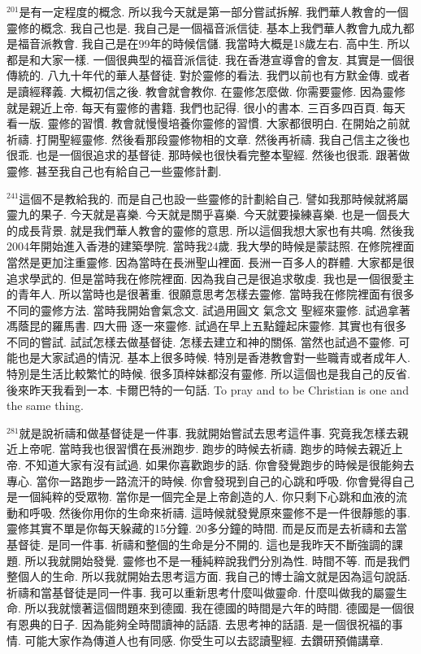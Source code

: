 \documentclass{book}
\begin{document}
$^{201}$是有一定程度的概念.
所以我今天就是第一部分嘗試拆解.
我們華人教會的一個靈修的概念.
我自己也是.
我自己是一個福音派信徒.
基本上我們華人教會九成九都是福音派教會.
我自己是在99年的時候信儲.
我當時大概是18歲左右.
高中生.
所以都是和大家一樣.
一個很典型的福音派信徒.
我在香港宣導會的會友.
其實是一個很傳統的.
八九十年代的華人基督徒.
對於靈修的看法.
我們以前也有方默金傳.
或者是讀經釋義.
大概初信之後.
教會就會教你.
在靈修怎麼做.
你需要靈修.
因為靈修就是親近上帝.
每天有靈修的書籍.
我們也記得.
很小的書本.
三百多四百頁.
每天看一版.
靈修的習慣.
教會就慢慢培養你靈修的習慣.
大家都很明白.
在開始之前就祈禱.
打開聖經靈修.
然後看那段靈修物相的文章.
然後再祈禱.
我自己信主之後也很乖.
也是一個很追求的基督徒.
那時候也很快看完整本聖經.
然後也很乖.
跟著做靈修.
甚至我自己也有給自己一些靈修計劃.

$^{241}$這個不是教給我的.
而是自己也設一些靈修的計劃給自己.
譬如我那時候就將屬靈九的果子.
今天就是喜樂.
今天就是關乎喜樂.
今天就要操練喜樂.
也是一個長大的成長背景.
就是我們華人教會的靈修的意思.
所以這個我想大家也有共鳴.
然後我2004年開始進入香港的建築學院.
當時我24歲.
我大學的時候是蒙誌照.
在修院裡面當然是更加注重靈修.
因為當時在長洲聖山裡面.
長洲一百多人的群體.
大家都是很追求學武的.
但是當時我在修院裡面.
因為我自己是很追求敬虔.
我也是一個很愛主的青年人.
所以當時也是很著重.
很願意思考怎樣去靈修.
當時我在修院裡面有很多不同的靈修方法.
當時我開始會氣念文.
試過用圓文 氣念文 聖經來靈修.
試過拿著馮蔭昆的羅馬書.
四大冊 逐一來靈修.
試過在早上五點鐘起床靈修.
其實也有很多不同的嘗試.
試試怎樣去做基督徒.
怎樣去建立和神的關係.
當然也試過不靈修.
可能也是大家試過的情況.
基本上很多時候.
特別是香港教會對一些職青或者成年人.
特別是生活比較繁忙的時候.
很多頂梓妹都沒有靈修.
所以這個也是我自己的反省.
後來昨天我看到一本.
卡爾巴特的一句話.
To pray and to be Christian is one and the same thing.

$^{281}$就是說祈禱和做基督徒是一件事.
我就開始嘗試去思考這件事.
究竟我怎樣去親近上帝呢.
當時我也很習慣在長洲跑步.
跑步的時候去祈禱.
跑步的時候去親近上帝.
不知道大家有沒有試過.
如果你喜歡跑步的話.
你會發覺跑步的時候是很能夠去專心.
當你一路跑步一路流汗的時候.
你會發現到自己的心跳和呼吸.
你會覺得自己是一個純粹的受眾物.
當你是一個完全是上帝創造的人.
你只剩下心跳和血液的流動和呼吸.
然後你用你的生命來祈禱.
這時候就發覺原來靈修不是一件很靜態的事.
靈修其實不單是你每天躲藏的15分鐘.
20多分鐘的時間.
而是反而是去祈禱和去當基督徒.
是同一件事.
祈禱和整個的生命是分不開的.
這也是我昨天不斷強調的課題.
所以我就開始發覺.
靈修也不是一種純粹說我們分別為性.
時間不等.
而是我們整個人的生命.
所以我就開始去思考這方面.
我自己的博士論文就是因為這句說話.
祈禱和當基督徒是同一件事.
我可以重新思考什麼叫做靈命.
什麼叫做我的屬靈生命.
所以我就懷著這個問題來到德國.
我在德國的時間是六年的時間.
德國是一個很有恩典的日子.
因為能夠全時間讀神的話語.
去思考神的話語.
是一個很祝福的事情.
可能大家作為傳道人也有同感.
你受生可以去認讀聖經.
去鑽研預備講章.
\end{document}
